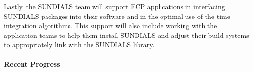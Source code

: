 Lastly, the SUNDIALS team will support ECP applications in interfacing SUNDIALS packages into their
software and in the optimal use of the time integration algorithms.  This support will also include working with the application teams to help them install SUNDIALS and adjust their build systems to appropriately link with the SUNDIALS library. 




\paragraph{Recent Progress}

